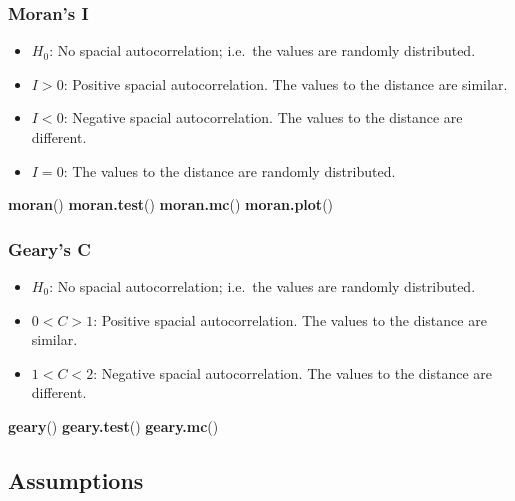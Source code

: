 \documentclass[
]{book}
\newenvironment{Shaded}{\begin{snugshade}}{\end{snugshade}}
\newcommand{\FunctionTok}[1]{\textcolor[rgb]{0.13,0.29,0.53}{\textbf{#1}}}
\newcommand{\NormalTok}[1]{#1}
\theoremstyle{definition}
\theoremstyle{definition}
\theoremstyle{definition}
\theoremstyle{definition}
\theoremstyle{remark}
\begin{document}
\subsubsection*{Moran's I}\label{morans-i}

\begin{itemize}
\item
  \(H_0\): No spacial autocorrelation; i.e.~the values are randomly distributed.
\item
  \(I>0\): Positive spacial autocorrelation. The values to the distance are similar.
\item
  \(I<0\): Negative spacial autocorrelation. The values to the distance are different.
\item
  \(I=0\): The values to the distance are randomly distributed.
\end{itemize}

\begin{Shaded}
\begin{Highlighting}[]
\FunctionTok{moran}\NormalTok{()}
\FunctionTok{moran.test}\NormalTok{()}
\FunctionTok{moran.mc}\NormalTok{()}
\FunctionTok{moran.plot}\NormalTok{()}
\end{Highlighting}
\end{Shaded}

\subsubsection*{Geary's C}\label{gearys-c}

\begin{itemize}
\item
  \(H_0\): No spacial autocorrelation; i.e.~the values are randomly distributed.
\item
  \(0<C>1\): Positive spacial autocorrelation. The values to the distance are similar.
\item
  \(1<C<2\): Negative spacial autocorrelation. The values to the distance are different.
\end{itemize}

\begin{Shaded}
\begin{Highlighting}[]
\FunctionTok{geary}\NormalTok{()}
\FunctionTok{geary.test}\NormalTok{()}
\FunctionTok{geary.mc}\NormalTok{()}
\end{Highlighting}
\end{Shaded}

\subsection*{Assumptions}\label{assumptions}
\end{document}

